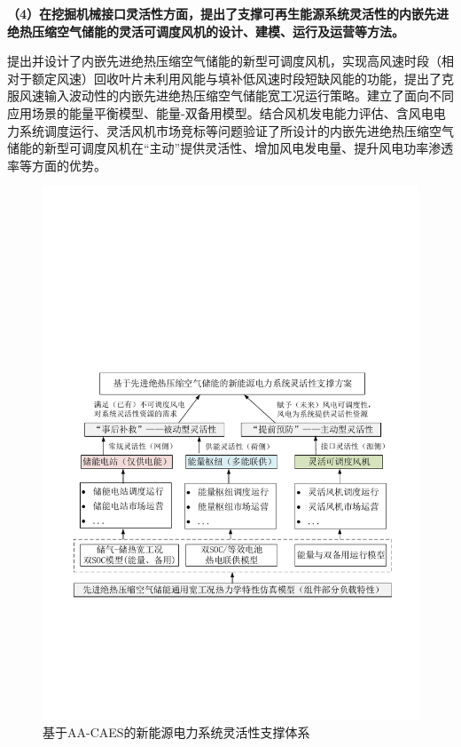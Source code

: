 \textbf{（4）在挖掘机械接口灵活性方面，提出了支撑可再生能源系统灵活性的内嵌先进绝热压缩空气储能的灵活可调度风机的设计、建模、运行及运营等方法。}

提出并设计了内嵌先进绝热压缩空气储能的新型可调度风机，实现高风速时段（相对于额定风速）回收叶片未利用风能与填补低风速时段短缺风能的功能，提出了克服风速输入波动性的内嵌先进绝热压缩空气储能宽工况运行策略。建立了面向不同应用场景的能量平衡模型、能量-双备用模型。结合风机发电能力评估、含风电电力系统调度运行、灵活风机市场竞标等问题验证了所设计的内嵌先进绝热压缩空气储能的新型可调度风机在“主动”提供灵活性、增加风电发电量、提升风电功率渗透率等方面的优势。

\begin{figure}[H] %
  \centering
  \includegraphics[scale=0.75]{figures/Chap6-Flexibility-Framework.pdf}
  \caption{基于AA-CAES的新能源电力系统灵活性支撑体系}
  \label{fig:Flexibility-Framework}
\end{figure}

